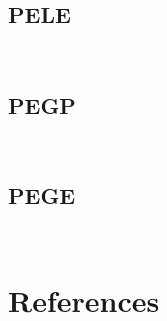 \documentclass[a4paper,notitlepage]{article}
\newcommand{\sourcecode}[3]{%
\inputminted[linenos=true,tabsize=4,fontsize=\small,frame=lines,framesep=2mm]{c}{#1/#2}
\inputminted[linenos=true,tabsize=4,fontsize=\small,frame=lines,framesep=2mm]{c}{#1/#3}
}
\begin{document}
\subsection{PELE}
\sourcecode{../Algorithms/PredEvalLocalEvent}{pele.h}{pele.c}

\subsection{PEGP}
\sourcecode{../Algorithms/PredEvalGlobalPeriodic}{pegp.h}{pegp.c}

\subsection{PEGE}
\sourcecode{../Algorithms/PredEvalGlobalEvent}{pege.h}{pege.c}


\newpage


\section{References}
\renewcommand{\refname}{\vspace{-1cm}}


\end{document}
